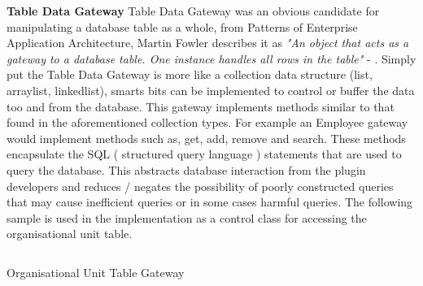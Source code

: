 		\large{\bfseries{Table Data Gateway}}	
		\newline		
		\normalsize
		{			
			Table Data Gateway was an obvious candidate for manipulating a database table as a whole, from Patterns of Enterprise Application Architecture,
			Martin Fowler describes it as \emph{ "An object that acts as a gateway to a database table. One instance handles all rows in the table"  }	
			- \citet{FowlerPatternsArchiteture}. Simply put the Table Data Gateway is more like a collection data structure (list, arraylist, linkedlist), 
			smarts bits can be implemented to control or buffer the data too and from the database.
			\newline
			\newline
			This gateway implements methods similar to that found in the aforementioned collection types.  For example an Employee gateway
			would implement methods such as, get, add, remove and search.  These methods encapsulate the SQL ( structured query language ) statements
			that are used to query the database.  This abstracts database interaction from the plugin developers and reduces / negates the possibility of
			poorly constructed queries that may cause inefficient queries or in some cases harmful queries.  The following sample is used in the implementation
			as a control class for accessing the organisational unit table.
		}
			
		\vspace{2mm}
		\begin{figurehere}
			\inputminted[linenos=true,fontsize=\footnotesize,tabsize=2]{csharp}{pages/chapter3/smippets/ougateway}
			\vspace{-2mm}
			\caption{Organisational Unit Table Gateway}
			\label{fig:ougateway}
		\end{figurehere}

\newpage		
		
